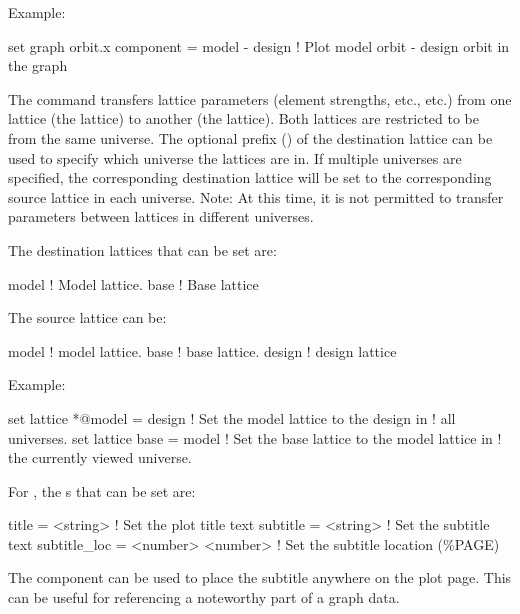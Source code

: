 {{\begin{description}
Example:
\begin{example}
  set graph orbit.x component = model - design  
                          ! Plot model orbit - design orbit in the graph
\end{example}


\item[set lattice \{n@\}<destination\_lat> = <source\_lat>] \Newline
The  command transfers lattice parameters (element
strengths, etc., etc.) from one lattice (the  lattice) to
another (the  lattice). Both lattices are restricted
to be from the same universe. The optional  prefix
() of the destination lattice can be used to specify
which universe the lattices are in. If multiple universes are
specified, the corresponding destination lattice will be set to the
corresponding source lattice in each universe. Note: At this time, it
is not permitted to transfer parameters between lattices in different
universes.

The destination lattices that can be set are:
\begin{example}
  model      ! Model lattice.
  base       ! Base lattice
\end{example}
The source lattice can be:
\begin{example}
  model       ! model lattice.
  base        ! base lattice.
  design      ! design lattice
\end{example}

Example:
\begin{example}
  set lattice *@model = design  ! Set the model lattice to the design in 
                                !   all universes.
  set lattice base = model      ! Set the base lattice to the model lattice in 
                                !   the currently viewed universe.
\end{example}


\item[set plot\_page <component> = <value1> \{<value2>\}] \Newline
For , the s that can be set are:
\begin{example}
  title        = <string>          ! Set the plot title text
  subtitle     = <string>          ! Set the subtitle text
  subtitle_loc = <number> <number> ! Set the subtitle location (\%PAGE)
\end{example}
The  component can be used to place the subtitle anywhere on
the plot page. This can be useful for referencing a noteworthy part of a graph
data.


\end{description}}}
